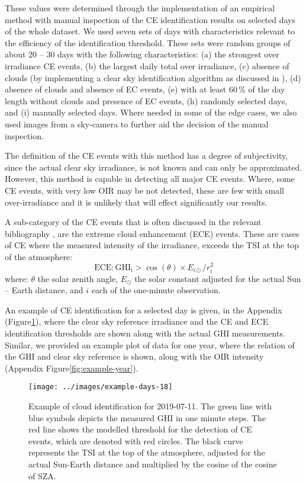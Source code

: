 \documentclass[preprint, 5p,
authoryear]{elsarticle} %
\begin{document}
These values were determined through the implementation of an empirical
method with manual inspection of the CE identification results on
selected days of the whole dataset. We used seven sets of days with
characteristics relevant to the efficiency of the identification
threshold. These sets were random groups of about 20 -- 30 days with the
following characteristics: (a) the strongest over irradiance CE events,
(b) the largest daily total over irradiance, (c) absence of clouds (by
implementing a clear sky identification algorithm as discussed in
\citet{Natsis2023}), (d) absence of clouds and absence of EC events, (e)
with at least \(60\,\%\) of the day length without clouds and presence
of EC events, (h) randomly selected days, and (i) manually selected
days. Where needed in some of the edge cases, we also used images from a
sky-camera to further aid the decision of the manual inspection.

The definition of the CE events with this method has a degree of
subjectivity, since the actual clear sky irradiance, is not known and
can only be approximated. However, this method is capable in detecting
all major CE events. Where, some CE events, with very low OIR may be not
detected, these are few with small over-irradiance and it is unlikely
that will effect significantly our results.

A sub-category of the CE events that is often discussed in the relevant
bibliography \citep{Cordero2023, Martins2022, Yordanov2015}, are the
extreme cloud enhancement (ECE) events. These are cases of CE where the
measured intensity of the irradiance, exceeds the TSI at the top of the
atmosphere: \begin{equation}
\text{ECE}: \text{GHI}_\text{i} > \cos(\theta) \times E_{i\odot} / r_{i}^2
\label{eq:ECE}
\end{equation} where: \(\theta\) the solar zenith angle, \(E_{\odot}\)
the solar constant adjusted for the actual Sun -- Earth distance, and
\(i\) each of the one-minute observation.

An example of CE identification for a selected day is given, in the
Appendix (Figure\nobreakspace{}\ref{fig:example-day}), where the clear
sky reference irradiance and the CE and ECE identification thresholds
are shown along with the actual GHI measurements. Similar, we provided
an example plot of data for one year, where the relation of the GHI and
clear sky reference is shown, along with the OIR intensity (Appendix
Figure\nobreakspace{}\ref{fig:example-year}).

\begin{figure}[H]

{\centering \texttt{[image: ../images/example-days-18]} 

}

\caption{Example of cloud identification for 2019-07-11. The green line with blue symbols depicts the measured GHI in one minute steps. The red line shows the modelled threshold for the detection of CE events, which are denoted with red circles. The black curve represents the TSI at the top of the atmosphere, adjusted for the actual Sun-Earth distance and multiplied by the cosine of the cosine of SZA.}\label{fig:example-day}
\end{figure}
\end{document}
